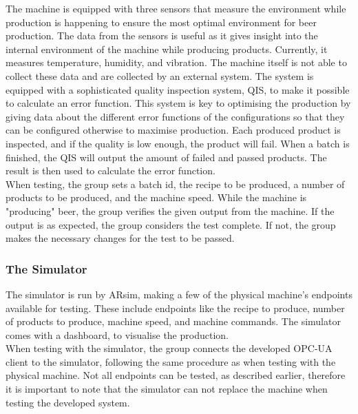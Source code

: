 The machine is equipped with three sensors that measure the environment while
production is happening to ensure the most optimal environment for beer
production. The data from the sensors is useful as it gives insight into the
internal environment of the machine while producing products. Currently, it
measures temperature, humidity, and vibration. The machine itself is not able to
collect these data and are collected by an external system. The system is
equipped with a sophisticated quality inspection system, QIS, to make it
possible to calculate an error function. This system is key to optimising the
production by giving data about the different error functions of the
configurations so that they can be configured otherwise to maximise production.
Each produced product is inspected, and if the quality is low enough, the
product will fail. When a batch is finished, the QIS will output the amount of
failed and passed products. The result is then used to calculate the error
function. \\

When testing, the group sets a batch id, the recipe to be produced, a number of
products to be produced, and the machine speed. While the machine is "producing"
beer, the group verifies the given output from the machine. If the output is as
expected, the group considers the test complete. If not, the group makes the
necessary changes for the test to be passed. 


\subsubsection{The Simulator}
The simulator is run by ARsim, making a few of the physical machine's endpoints
available for testing. These include endpoints like the recipe to produce,
number of products to produce, machine speed, and machine commands. The
simulator comes with a dashboard, to visualise the production. \\

When testing with the simulator, the group connects the developed OPC-UA client
to the simulator, following the same procedure as when testing with the
physical machine. Not all endpoints can be tested, as described earlier,
therefore it is important to note that the simulator can not replace the machine
when testing the developed system.
